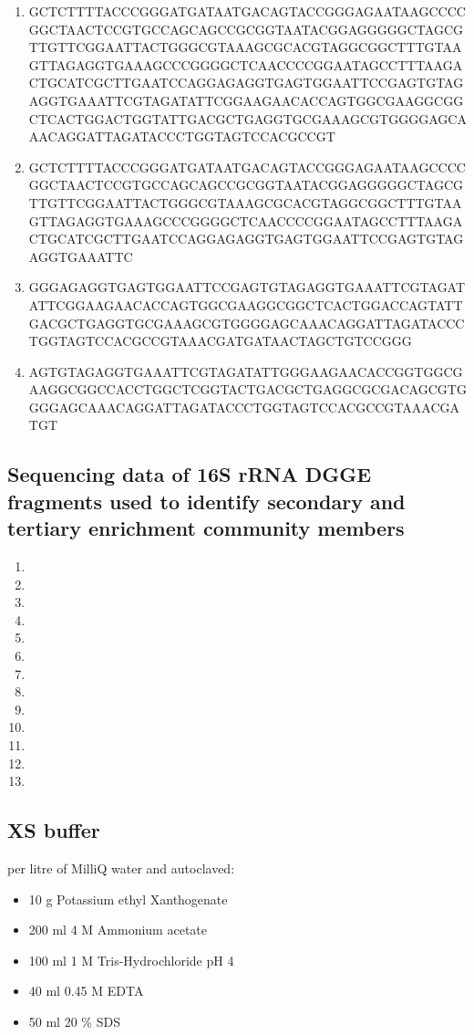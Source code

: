 \documentclass[11pt]{article}
\begin{document}
\begin{enumerate}
\item GCTCTTTTACCCGGGATGATAATGACAGTACCGGGAGAATAAGCCCCGGCTAACTCCGTGCCAGCAGCCGCGGTAATACGGAGGGGGCTAGCGTTGTTCGGAATTACTGGGCGTAAAGCGCACGTAGGCGGCTTTGTAAGTTAGAGGTGAAAGCCCGGGGCTCAACCCCGGAATAGCCTTTAAGACTGCATCGCTTGAATCCAGGAGAGGTGAGTGGAATTCCGAGTGTAGAGGTGAAATTCGTAGATATTCGGAAGAACACCAGTGGCGAAGGCGGCTCACTGGACTGGTATTGACGCTGAGGTGCGAAAGCGTGGGGAGCAAACAGGATTAGATACCCTGGTAGTCCACGCCGT
\item GCTCTTTTACCCGGGATGATAATGACAGTACCGGGAGAATAAGCCCCGGCTAACTCCGTGCCAGCAGCCGCGGTAATACGGAGGGGGCTAGCGTTGTTCGGAATTACTGGGCGTAAAGCGCACGTAGGCGGCTTTGTAAGTTAGAGGTGAAAGCCCGGGGCTCAACCCCGGAATAGCCTTTAAGACTGCATCGCTTGAATCCAGGAGAGGTGAGTGGAATTCCGAGTGTAGAGGTGAAATTC
\item GGGAGAGGTGAGTGGAATTCCGAGTGTAGAGGTGAAATTCGTAGATATTCGGAAGAACACCAGTGGCGAAGGCGGCTCACTGGACCAGTATTGACGCTGAGGTGCGAAAGCGTGGGGAGCAAACAGGATTAGATACCCTGGTAGTCCACGCCGTAAACGATGATAACTAGCTGTCCGGG 
\item AGTGTAGAGGTGAAATTCGTAGATATTGGGAAGAACACCGGTGGCGAAGGCGGCCACCTGGCTCGGTACTGACGCTGAGGCGCGACAGCGTGGGGAGCAAACAGGATTAGATACCCTGGTAGTCCACGCCGTAAACGATGT
\end{enumerate}

\subsection{Sequencing data of 16S rRNA DGGE fragments used to identify secondary and tertiary enrichment community members}
\begin{enumerate}
\item 
\item 
\item 
\item 
\item 
\item 
\item 
\item 
\item 
\item 
\item 
\item 
\item 
\end{enumerate}

\subsection{XS buffer}
per litre of MilliQ water and autoclaved:
\begin{itemize}
\item 10 g Potassium ethyl Xanthogenate
\item 200 ml 4 M Ammonium acetate
\item 100 ml 1 M Tris-Hydrochloride pH 4
\item 40 ml 0.45 M EDTA
\item 50 ml 20 \% SDS
 
\end{itemize}
\end{document}
